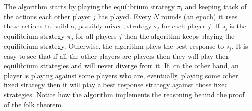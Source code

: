 The  algorithm starts by playing the equilibrium
strategy $\pi_i$ and keeping track of the actions each other player
$j$ has played.  Every $N$ rounds (an epoch) it uses these actions to
build a, possibly mixed, strategy $s_j$ for each player $j$. If $s_j$
is the equilibrium strategy $\pi_j$ for all players $j$ then the
algorithm keeps playing the equilibrium strategy. Otherwise, the
algorithm plays the best response to $s_j$. It is easy to see that if
all the other players are  players then they will play
their equilibrium strategies and will never diverge from it. If, on the
other hand, an  player is playing against some players
who are, eventually, playing some other fixed strategy then it will
play a best response strategy against those fixed strategies. Notice
how the algorithm implements the reasoning behind the proof of the
folk theorem.

